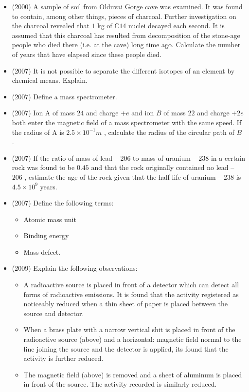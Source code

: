 \documentclass{article}
\begin{document}
\begin{itemize}
\item (2000)  A sample of soil from Olduvai Gorge cave was examined. It was found to contain, among other things, pieces of charcoal. Further investigation on the charcoal revealed that $ 1$ kg of C$ 14$ nuclei decayed each second. It is assumed that this charcoal has resulted from decomposition of the stone-age people who died there (i.e. at the cave) long time ago. Calculate the number of years that have elapsed since these people died.
\item (2007)  It is not possible to separate the different isotopes of an element by chemical means.  Explain.
\item (2007)  Define a mass spectrometer. 
\item (2007)  Ion A of mass $ 24$ and charge $ +e$ and ion $ B$ of mass $ 22$ and charge $ +2e$ both enter the magnetic field of a mass spectrometer with the same speed. If the radius of A is $ 2.5 \times 10^{-1}m$ , calculate the radius of the circular path of $ B$ . 
\item (2007)  If the ratio of mass of lead – $ 206$  to mass of uranium – $ 238$ in a certain rock was found to be $ 0.45$ and that the rock originally contained no lead – $ 206$ , estimate the age of the rock given that the half life of uranium – $ 238$ is $ 4.5 \times 10^{9}$ years.
\item (2007)  Define the following terms:\begin{itemize}
\item Atomic mass unit
\item Binding energy
\item Mass defect.
\end{itemize}
\item (2009)  Explain the following observations:\begin{itemize}
\item A radioactive source is placed in front of a detector which can detect all forms of radioactive emissions. It is found that the activity registered as noticeably reduced when a thin sheet of paper is placed between the source and detector.
\item When a brass plate with a narrow vertical shit is placed in front of the radioactive source (above) and a horizontal: magnetic field normal to the line joining the source and the detector is applied, its found that the activity is further reduced.
\item The magnetic field (above) is removed and a sheet of aluminum is placed in front of the source. The activity recorded is similarly reduced.

\end{itemize}
\end{itemize}
\end{document}
